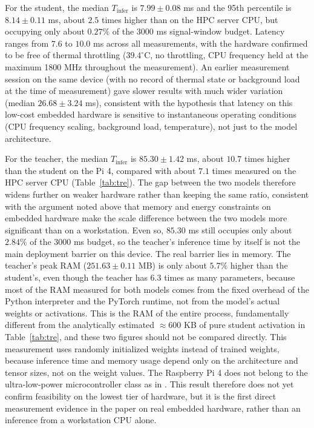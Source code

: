 For the student, the median $T_{\mathrm{infer}}$ is $7.99 \pm 0.08$
ms and the 95th percentile is $8.14 \pm 0.11$ ms, about $2.5$ times
higher than on the HPC server CPU, but occupying only about
$0.27\%$ of the 3000 ms signal-window budget. Latency ranges from
$7.6$ to $10.0$ ms across all measurements, with the hardware
confirmed to be free of thermal throttling ($39.4^\circ$C, no
throttling, CPU frequency held at the maximum 1800 MHz throughout the
measurement). An earlier measurement session on the same device
(with no record of thermal state or background load at the time of
measurement) gave slower results with much wider variation (median
$26.68 \pm 3.24$ ms), consistent with the hypothesis that latency on
this low-cost embedded hardware is sensitive to instantaneous
operating conditions (CPU frequency scaling, background load,
temperature), not just to the model architecture.

For the teacher, the median $T_{\mathrm{infer}}$ is $85.30 \pm 1.42$
ms, about $10.7$ times higher than the student on the Pi 4, compared
with about $7.1$ times measured on the HPC server CPU
(Table~\ref{tab:tre}). The gap between the two models therefore
widens further on weaker hardware rather than keeping the same
ratio, consistent with the argument noted above that memory and
energy constraints on embedded hardware make the scale difference
between the two models more significant than on a workstation. Even
so, $85.30$ ms still occupies only about $2.84\%$ of the 3000 ms
budget, so the teacher's inference time by itself is not the main
deployment barrier on this device. The real barrier lies in memory.
The teacher's peak RAM ($251.63 \pm 0.11$ MB) is only about $5.7\%$
higher than the student's, even though the teacher has $6.3$ times
as many parameters, because most of the RAM measured for both models
comes from the fixed overhead of the Python interpreter and the
PyTorch runtime, not from the model's actual weights or activations.
This is the RAM of the entire process, fundamentally different from
the analytically estimated $\approx 600$ KB of pure student
activation in Table~\ref{tab:tre}, and these two figures should not
be compared directly. This measurement uses randomly initialized
weights instead of trained weights, because inference time and
memory usage depend only on the architecture and tensor sizes, not
on the weight values. The Raspberry Pi 4 does not belong to the
ultra-low-power microcontroller class as in \cite{wang2024mibminet}.
This result therefore does not yet confirm feasibility on the lowest
tier of hardware, but it is the first direct measurement evidence in
the paper on real embedded hardware, rather than an inference from a
workstation CPU alone.

